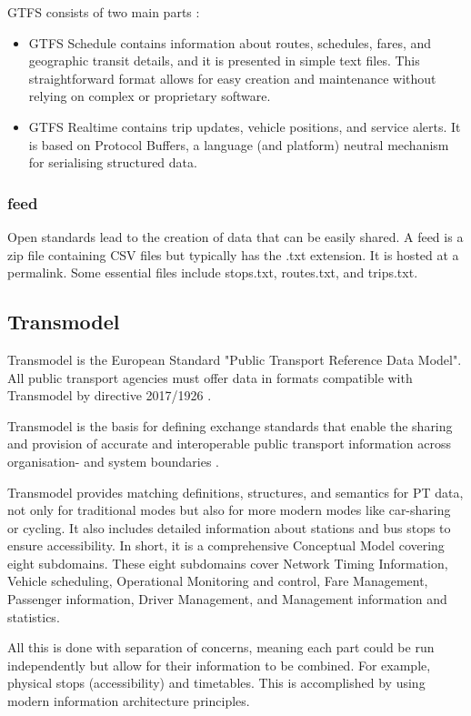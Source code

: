 GTFS consists of two main parts \cite{noauthor_general_nodate}:
\begin{itemize}
    \item GTFS Schedule contains information about routes, schedules, fares, and geographic transit details, and it is presented in simple text files. This straightforward format allows for easy creation and maintenance without relying on complex or proprietary software.
    \item GTFS Realtime contains trip updates, vehicle positions, and service alerts. It is based on Protocol Buffers, a language (and platform) neutral mechanism for serialising structured data.
\end{itemize}

\subsubsection{ feed}
Open standards lead to the creation of data that can be easily shared. A feed is a zip file containing CSV files but typically has the .txt extension. It is hosted at a permalink. Some essential files include stops.txt, routes.txt, and trips.txt.

\subsection{Transmodel}
Transmodel is the European Standard "Public Transport Reference Data Model". All public transport agencies must offer data in formats compatible with Transmodel by directive 2017/1926 \cite{noauthor_delegated_nodate}.

Transmodel is the basis for defining exchange standards that enable the sharing and provision of accurate and interoperable public transport information across organisation- and system boundaries \cite{noauthor_transmodel_nodate}.

Transmodel provides matching definitions, structures, and semantics for PT data, not only for traditional modes but also for more modern modes like car-sharing or cycling. It also includes detailed information about stations and bus stops to ensure accessibility. In short, it is a comprehensive Conceptual Model covering eight subdomains. These eight subdomains cover Network Timing Information, Vehicle scheduling, Operational Monitoring and control, Fare Management, Passenger information, Driver Management, and Management information and statistics.

All this is done with separation of concerns, meaning each part could be run independently but allow for their information to be combined. For example, physical stops (accessibility) and timetables. This is accomplished by using modern information architecture principles.


